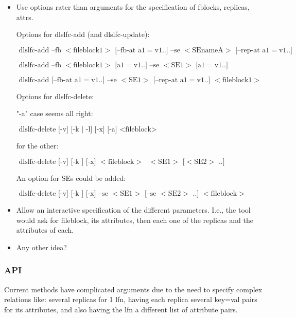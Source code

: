 \documentclass[pdftex]{cmspaper}
\begin{document}
\begin{itemize}
\item Use options rater than arguments for the specification of fblocks, replicas, attrs. 

Options for dlslfc-add (and dlslfc-update):

\begin{flushleft}
  $\mbox{ dlslfc-add --fb $<$fileblock1$>$ [--fb-at a1$=$v1..]  --se $<$SEnameA$>$ [--rep-at a1$=$v1..]}$
\end{flushleft}

\begin{flushleft}
  $\mbox{ dlslfc-add --fb $<$fileblock1$>$ [a1$=$v1..]  --se $<$SE1$>$ [a1$=$v1..] }$
\end{flushleft}

\begin{flushleft}
  $\mbox{ dlslfc-add  [--fb-at a1$=$v1..] --se $<$SE1$>$ [--rep-at a1$=$v1..] $<$fileblock1$>$ }$
\end{flushleft}


Options for dlslfc-delete:


"-a" case seems all right:
\begin{flushleft}
   $\mbox{ dlslfc-delete [-v] [-k | -l] [-x] [-a] <fileblock> }$
\end{flushleft}

for the other:
\begin{flushleft}
   $\mbox{ dlslfc-delete [-v] [-k ] [-x] $<$fileblock$>$ $<$SE1$>$ [$<$SE2$>$ ..]}$
\end{flushleft}                                                                                                                                               
An option for SEs could be added:
\begin{flushleft}
   $\mbox{ dlslfc-delete [-v] [-k ] [-x] --se $<$SE1$>$ [--se $<$SE2$>$ ..]  $<$fileblock$>$}$
\end{flushleft} 

\item Allow an interactive specification of the different parameters. I.e., the tool would
ask for fileblock, its attributes, then each one of the replicas and the attributes of each.

\item Any other idea?

\end{itemize}

\subsubsection{API}
Current methods have complicated arguments due to the need to specify complex
relations like: several replicas for 1 lfn, having each replica several key=val
pairs for its attributes, and also having the lfn a different list of attribute
pairs.
                                                                                                                                               
\end{document}
